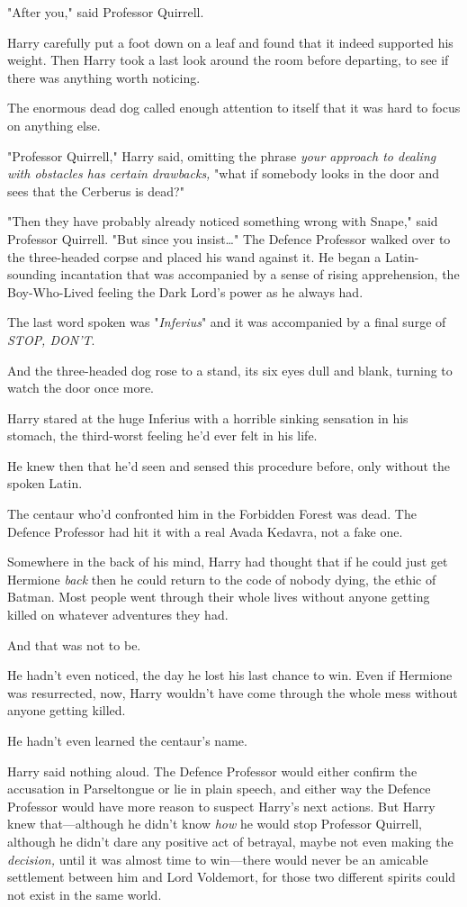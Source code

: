 "After you," said Professor Quirrell.

Harry carefully put a foot down on a leaf and found that it indeed supported
his weight. Then Harry took a last look around the room before departing, to
see if there was anything worth noticing.

The enormous dead dog called enough attention to itself that it was hard to
focus on anything else.

"Professor Quirrell," Harry said, omitting the phrase \emph{your approach to
dealing with obstacles has certain drawbacks,} "what if somebody looks in the
door and sees that the Cerberus is dead?"

"Then they have probably already noticed something wrong with Snape," said
Professor Quirrell. "But since you insist…" The Defence Professor walked
over to the three-headed corpse and placed his wand against it. He began a
Latin-sounding incantation that was accompanied by a sense of rising
apprehension, the Boy-Who-Lived feeling the Dark Lord's power as he always had.

The last word spoken was "\emph{Inferius}" and it was accompanied by a final
surge of \emph{STOP, DON'T}.

And the three-headed dog rose to a stand, its six eyes dull and blank, turning
to watch the door once more.

Harry stared at the huge Inferius with a horrible sinking sensation in his
stomach, the third-worst feeling he'd ever felt in his life.

He knew then that he'd seen and sensed this procedure before, only without the
spoken Latin.

The centaur who'd confronted him in the Forbidden Forest was dead. The Defence
Professor had hit it with a real Avada Kedavra, not a fake one.

Somewhere in the back of his mind, Harry had thought that if he could just get
Hermione \emph{back} then he could return to the code of nobody dying, the
ethic of Batman. Most people went through their whole lives without anyone
getting killed on whatever adventures they had.

And that was not to be.

He hadn't even noticed, the day he lost his last chance to win. Even if
Hermione was resurrected, now, Harry wouldn't have come through the whole mess
without anyone getting killed.

He hadn't even learned the centaur's name.

Harry said nothing aloud. The Defence Professor would either confirm the
accusation in Parseltongue or lie in plain speech, and either way the Defence
Professor would have more reason to suspect Harry's next actions. But Harry
knew that---although he didn't know \emph{how} he would stop Professor
Quirrell, although he didn't dare any positive act of betrayal, maybe not even
making the \emph{decision,} until it was almost time to win---there would never
be an amicable settlement between him and Lord Voldemort, for those two
different spirits could not exist in the same world.

